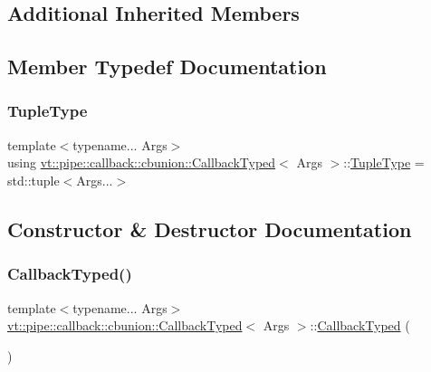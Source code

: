 \subsection*{Additional Inherited Members}


\subsection{Member Typedef Documentation}
\mbox{\label{structvt_1_1pipe_1_1callback_1_1cbunion_1_1_callback_typed_ae236a8bcffe928ee956fbd9df57181d3}} 
\subsubsection{\texorpdfstring{Tuple\+Type}{TupleType}}
{\footnotesize\ttfamily template$<$typename... Args$>$ \\
using \hyperlink{structvt_1_1pipe_1_1callback_1_1cbunion_1_1_callback_typed}{vt\+::pipe\+::callback\+::cbunion\+::\+Callback\+Typed}$<$ Args $>$\+::\hyperlink{structvt_1_1pipe_1_1callback_1_1cbunion_1_1_callback_typed_ae236a8bcffe928ee956fbd9df57181d3}{Tuple\+Type} =  std\+::tuple$<$Args...$>$}



\subsection{Constructor \& Destructor Documentation}
\mbox{\label{structvt_1_1pipe_1_1callback_1_1cbunion_1_1_callback_typed_a98d90baa0ff16d16c1918810edce406f}} 
\subsubsection{\texorpdfstring{Callback\+Typed()}{CallbackTyped()}\hspace{0.1cm}{\footnotesize\ttfamily [1/12]}}
{\footnotesize\ttfamily template$<$typename... Args$>$ \\
\hyperlink{structvt_1_1pipe_1_1callback_1_1cbunion_1_1_callback_typed}{vt\+::pipe\+::callback\+::cbunion\+::\+Callback\+Typed}$<$ Args $>$\+::\hyperlink{structvt_1_1pipe_1_1callback_1_1cbunion_1_1_callback_typed}{Callback\+Typed} (\begin{DoxyParamCaption}{ }\end{DoxyParamCaption})\hspace{0.3cm}{\ttfamily [default]}}

